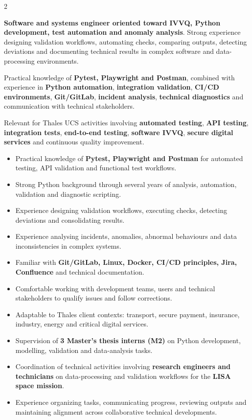 \documentclass[8pt,a4paper,ragged2e,withhyper]{altacv}
\begin{document}
\begin{paracol}{2}
\switchcolumn


\textbf{Software and systems engineer oriented toward IVVQ, Python development, test automation and anomaly analysis}. Strong experience designing validation workflows, automating checks, comparing outputs, detecting deviations and documenting technical results in complex software and data-processing environments.

Practical knowledge of \textbf{Pytest, Playwright and Postman}, combined with experience in \textbf{Python automation}, \textbf{integration validation}, \textbf{CI/CD environments}, \textbf{Git/GitLab}, \textbf{incident analysis}, \textbf{technical diagnostics} and communication with technical stakeholders.

Relevant for Thales UCS activities involving \textbf{automated testing}, \textbf{API testing}, \textbf{integration tests}, \textbf{end-to-end testing}, \textbf{software IVVQ}, \textbf{secure digital services} and continuous quality improvement.


\begin{itemize}
  \item Practical knowledge of \textbf{Pytest, Playwright and Postman} for automated testing, API validation and functional test workflows.
  \item Strong Python background through several years of analysis, automation, validation and diagnostic scripting.
  \item Experience designing validation workflows, executing checks, detecting deviations and consolidating results.
  \item Experience analysing incidents, anomalies, abnormal behaviours and data inconsistencies in complex systems.
  \item Familiar with \textbf{Git/GitLab, Linux, Docker, CI/CD principles, Jira, Confluence} and technical documentation.
  \item Comfortable working with development teams, users and technical stakeholders to qualify issues and follow corrections.
  \item Adaptable to Thales client contexts: transport, secure payment, insurance, industry, energy and critical digital services.
\end{itemize}


\begin{itemize}
  \item Supervision of \textbf{3 Master's thesis interns (M2)} on Python development, modelling, validation and data-analysis tasks.
  \item Coordination of technical activities involving \textbf{research engineers and technicians} on data-processing and validation workflows for the \textbf{LISA space mission}.
  \item Experience organizing tasks, communicating progress, reviewing outputs and maintaining alignment across collaborative technical developments.
\end{itemize}


\end{paracol}
\end{document}
